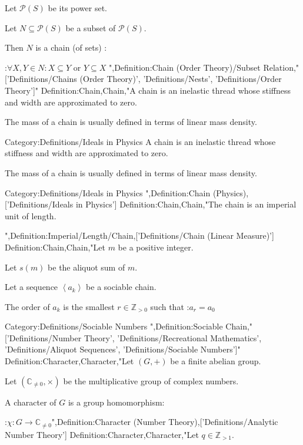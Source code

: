 Let $\mathcal P \left( S \right)$ be its power set.

Let $N \subseteq \mathcal P \left( S \right)$ be a subset of $\mathcal P \left( S \right)$.


Then $N$ is a chain (of sets) :

:$\forall X, Y \in N: X \subseteq Y$ or $Y \subseteq X$
",Definition:Chain (Order Theory)/Subset Relation,"['Definitions/Chains (Order Theory)', 'Definitions/Nests', 'Definitions/Order Theory']"
Definition:Chain,Chain,"A chain is an inelastic thread whose stiffness and width are approximated to zero.

The mass of a chain is usually defined in terms of linear mass density.


Category:Definitions/Ideals in Physics
A chain is an inelastic thread whose stiffness and width are approximated to zero.

The mass of a chain is usually defined in terms of linear mass density.


Category:Definitions/Ideals in Physics
",Definition:Chain (Physics),['Definitions/Ideals in Physics']
Definition:Chain,Chain,"The chain is an imperial unit of length.









",Definition:Imperial/Length/Chain,['Definitions/Chain (Linear Measure)']
Definition:Chain,Chain,"Let $m$ be a positive integer.

Let $s \left({m}\right)$ be the aliquot sum of $m$.


Let a sequence $\left\langle{a_k}\right\rangle$ be a sociable chain.

The order of $a_k$ is the smallest $r \in \mathbb Z_{>0}$ such that
:$a_r = a_0$


Category:Definitions/Sociable Numbers
",Definition:Sociable Chain,"['Definitions/Number Theory', 'Definitions/Recreational Mathematics', 'Definitions/Aliquot Sequences', 'Definitions/Sociable Numbers']"
Definition:Character,Character,"Let $\left( G, + \right)$ be a finite abelian group.

Let $\left( \mathbb C_{\ne 0}, \times \right)$ be the multiplicative group of complex numbers.


A character of $G$ is a group homomorphism:

:$\chi: G \to \mathbb C_{\ne 0}$",Definition:Character (Number Theory),['Definitions/Analytic Number Theory']
Definition:Character,Character,"Let $q \in \mathbb Z_{>1}$.

